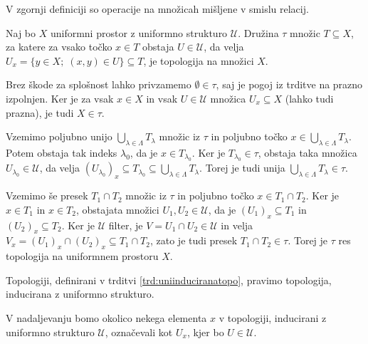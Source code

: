 \documentclass[mat1]{fmfdelo}
\newcommand{\Ucurl}{\mathcal{U}}
\begin{document}
\begin{opomba}
	V zgornji definiciji so operacije na množicah mišljene v smislu relacij.
\end{opomba}

\begin{trditev}\label{trd:uniinduciranatopo}
Naj bo $X$ uniformni prostor z uniformno strukturo $\mathcal{U}$. Družina $\tau$ množic $T \subseteq X$, za katere za vsako točko $x \in T$ obstaja $U \in \mathcal{U}$, da velja $U_x = \lbrace y \in X ;\; (x, y) \in U \rbrace \subseteq T$, je topologija na množici $X$.
\end{trditev}

\begin{dokaz}
Brez škode za splošnost lahko privzamemo $\emptyset \in \tau$, saj je pogoj iz trditve na prazno izpolnjen. Ker je za vsak $x \in X$ in vsak $U \in \Ucurl$ množica $U_x \subseteq X$ (lahko tudi prazna), je tudi $X \in \tau$.

Vzemimo poljubno unijo $\bigcup_{\lambda \in \Lambda} T_\lambda$ množic iz $\tau$ in poljubno točko $x \in \bigcup_{\lambda \in \Lambda} T_\lambda$. Potem obstaja
tak indeks $\lambda_0$, da je $x \in T_{\lambda_0}$. Ker je $T_{\lambda_0} \in \tau$, obstaja taka množica $U_ {\lambda_0} \in \Ucurl$, da velja $(U_{\lambda_0})_x \subseteq T_{\lambda_0} \subseteq \bigcup_{\lambda \in \Lambda} T_\lambda$. Torej je tudi unija $\bigcup_{\lambda \in \Lambda} T_\lambda \in \tau$.

Vzemimo še presek $T_1 \cap T_2$ množic iz $\tau$ in poljubno točko $x \in T_1 \cap T_2$. Ker je $x \in T_1$ in $x \in T_2$, obstajata množici $U_1, U_2 \in \Ucurl$, da je $(U_{1})_x \subseteq T_1$ in $(U_{2})_x \subseteq T_2$. Ker je $\Ucurl$ filter, je $V = U_1 \cap U_2 \in \Ucurl$ in velja
$V_x = (U_{1})_x\cap (U_{2})_x \subseteq T_1 \cap T_2$, zato je tudi presek $T_1 \cap T_2 \in \tau$. Torej je $\tau$ res topologija na uniformnem prostoru $X$.
\end{dokaz}

\begin{definicija}\label{def:uniinduciranatopo}
Topologiji, definirani v trditvi \ref{trd:uniinduciranatopo}, pravimo topologija, inducirana z uniformno strukturo.
\end{definicija}

\begin{opomba}
	V nadaljevanju bomo okolico nekega elementa $x$ v topologiji, in\-du\-ci\-ra\-ni z uniformno strukturo $\mathcal{U}$, označevali kot $U_x$, kjer bo $U \in \mathcal{U}$.
\end{opomba}
\end{document}
